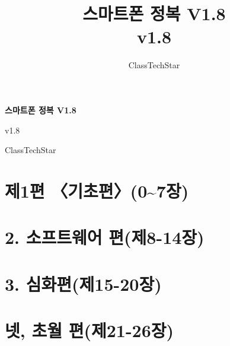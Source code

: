\documentclass[11pt,a4paper,openany]{book}
\title{스마트폰 정복 V1.8\\ \large v1.8}
\author{ClassTechStar}
\date{}
\begin{document}
\begin{titlepage}
\centering
\vspace*{0.28\textheight}
{\Huge\bfseries 스마트폰 정복 V1.8\par}
\vspace{1.2em}
{\Large v1.8\par}
\vfill
{\large ClassTechStar\par}
\end{titlepage}
\frontmatter
\tableofcontents
\mainmatter
\part*{제1편 〈기초편〉(0\textasciitilde{}7장)}










\part*{2. 소프트웨어 편(제8-14장)}








\part*{3. 심화편(제15-20장)}







\part*{넷, 초월 편(제21-26장)}







\end{document}
